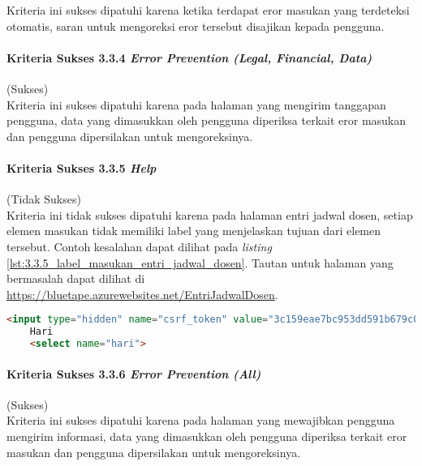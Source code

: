 Kriteria ini sukses dipatuhi karena ketika terdapat eror masukan yang terdeteksi otomatis, saran untuk mengoreksi eror tersebut disajikan kepada pengguna.

\paragraph{Kriteria Sukses 3.3.4 \textit{Error Prevention (Legal, Financial, Data)}}
\label{par:kepatuhan_bluetape_kriteria_sukses_3.3.4}
(Sukses)\\

Kriteria ini sukses dipatuhi karena pada halaman yang mengirim tanggapan pengguna, data yang dimasukkan oleh pengguna diperiksa terkait eror masukan dan pengguna dipersilakan untuk mengoreksinya.

\paragraph{Kriteria Sukses 3.3.5 \textit{Help}}
\label{par:kepatuhan_bluetape_kriteria_sukses_3.3.5}
(Tidak Sukses)\\

Kriteria ini tidak sukses dipatuhi karena pada halaman entri jadwal dosen, setiap elemen masukan tidak memiliki label yang menjelaskan tujuan dari elemen tersebut. Contoh kesalahan dapat dilihat pada \textit{listing} \ref{lst:3.3.5_label_masukan_entri_jadwal_dosen}. Tautan untuk halaman yang bermasalah dapat dilihat di \url{https://bluetape.azurewebsites.net/EntriJadwalDosen}.

\begin{lstlisting}[frame=single, label={lst:3.3.5_label_masukan_entri_jadwal_dosen}, language=HTML, caption=Pelanggaran Kriteria Sukses 3.3.5 pada Halaman Entri Jadwal Dosen]
    <input type="hidden" name="csrf_token" value="3c159eae7bc953dd591b679c080ed066"/>
    Hari
    <select name="hari">
\end{lstlisting}

\paragraph{Kriteria Sukses 3.3.6 \textit{Error Prevention (All)}}
\label{par:kepatuhan_bluetape_kriteria_sukses_3.3.6}
(Sukses)\\

Kriteria ini sukses dipatuhi karena pada halaman yang mewajibkan pengguna mengirim informasi, data yang dimasukkan oleh pengguna diperiksa terkait eror masukan dan pengguna dipersilakan untuk mengoreksinya.

